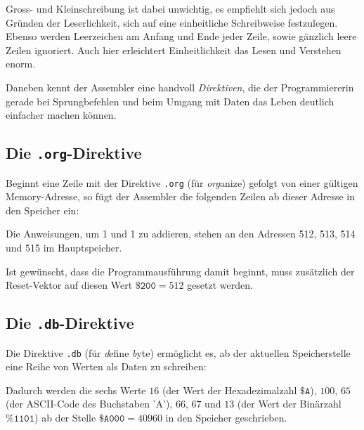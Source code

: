 \documentclass[11pt]{scrartcl}
\newcommand{\hex}[1]{\texttt{\$#1}}
\newcommand{\bin}[1]{\texttt{\%#1}}
\begin{document}
Gross- und Kleinschreibung ist dabei unwichtig, es empfiehlt sich
jedoch aus Gründen der Leserlichkeit, sich auf eine einheitliche
Schreibweise festzulegen. Ebenso werden Leerzeichen am Anfang und Ende
jeder Zeile, sowie gänzlich leere Zeilen ignoriert. Auch hier
erleichtert Einheitlichkeit das Lesen und Verstehen enorm.


Daneben kennt der Assembler eine handvoll \emph{Direktiven}, die der
Programmiererin gerade bei Sprungbefehlen und beim Umgang mit Daten
das Leben deutlich einfacher machen können.

\subsection{Die \texttt{.org}-Direktive}
\label{sec:org_directive}

Beginnt eine Zeile mit der Direktive \lstinline!.org! (für
\emph{org}anize) gefolgt von einer gültigen Memory-Adresse, so fügt
der Assembler die folgenden Zeilen ab dieser Adresse in den Speicher
ein:

\begin{center}
  
\end{center}

Die Anweisungen, um 1 und 1 zu addieren, stehen an den Adressen 512,
513, 514 und 515 im Hauptspeicher.

Ist gewünscht, dass die Programmausführung damit beginnt, muss
zusätzlich der Reset-Vektor auf diesen Wert $\hex{200}=512$ gesetzt
werden.

\subsection{Die \lstinline!.db!-Direktive}
\label{sec:db-directive}

Die Direktive \lstinline!.db! (für \emph{d}efine \emph{b}yte)
ermöglicht es, ab der aktuellen Speicherstelle eine Reihe von Werten
als Daten zu schreiben:

\begin{center}
  
\end{center}

Dadurch werden die sechs Werte $16$ (der Wert der Hexadezimalzahl
$\hex{A}$), $100$, $65$ (der ASCII-Code des Buchstaben 'A'), $66$,
$67$ und $13$ (der Wert der Binärzahl $\bin{1101}$) ab der Stelle
$\hex{A000}=40960$ in den Speicher geschrieben.
\end{document}

